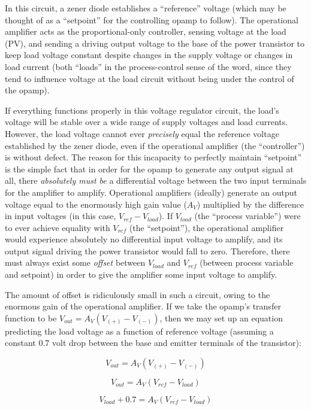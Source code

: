 In this circuit, a zener diode establishes a ``reference'' voltage (which may be thought of as a ``setpoint'' for the controlling opamp to follow).  The operational amplifier acts as the proportional-only controller, sensing voltage at the load (PV), and sending a driving output voltage to the base of the power transistor to keep load voltage constant despite changes in the supply voltage or changes in load current (both ``loads'' in the process-control sense of the word, since they tend to influence voltage at the load circuit without being under the control of the opamp).

If everything functions properly in this voltage regulator circuit, the load's voltage will be stable over a wide range of supply voltages and load currents.  However, the load voltage cannot ever \textit{precisely} equal the reference voltage established by the zener diode, even if the operational amplifier (the ``controller'') is without defect.  The reason for this incapacity to perfectly maintain ``setpoint'' is the simple fact that in order for the opamp to generate any output signal at all, there \textit{absolutely must be} a differential voltage between the two input terminals for the amplifier to amplify.  Operational amplifiers (ideally) generate an output voltage equal to the enormously high gain value ($A_V$) multiplied by the difference in input voltages (in this case, $V_{ref} - V_{load}$).  If $V_{load}$ (the ``process variable'') were to ever achieve equality with $V_{ref}$ (the ``setpoint''), the operational amplifier would experience absolutely no differential input voltage to amplify, and its output signal driving the power transistor would fall to zero.  Therefore, there must always exist some \textit{offset} between $V_{load}$ and $V_{ref}$ (between process variable and setpoint) in order to give the amplifier some input voltage to amplify.

The amount of offset is ridiculously small in such a circuit, owing to the enormous gain of the operational amplifier.  If we take the opamp's transfer function to be $V_{out} = A_V (V_{(+)} - V_{(-)})$, then we may set up an equation predicting the load voltage as a function of reference voltage (assuming a constant 0.7 volt drop between the base and emitter terminals of the transistor):

$$V_{out} = A_V(V_{(+)} - V_{(-)})$$

$$V_{out} = A_V(V_{ref} - V_{load})$$

$$V_{load} + 0.7 = A_V(V_{ref} - V_{load})$$

